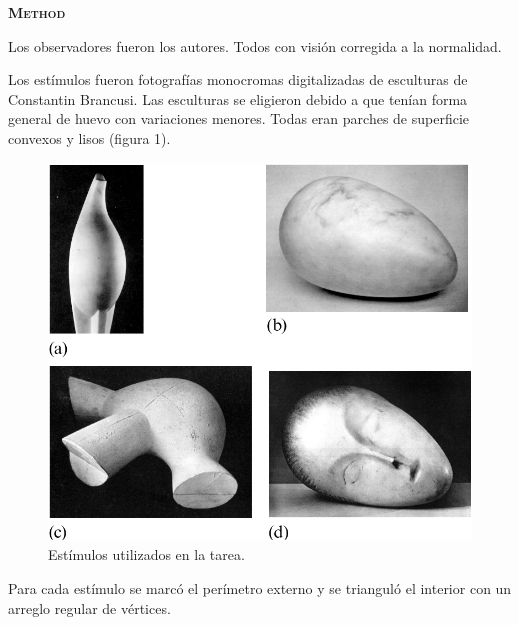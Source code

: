 \documentclass[a4paper,12pt]{article}
\begin{document}
{\scshape\bfseries Method}

Los observadores fueron los autores. Todos con visión corregida a la normalidad.

Los estímulos fueron fotografías monocromas digitalizadas de esculturas de Constantin Brancusi. Las esculturas se eligieron debido a que tenían forma general de huevo con variaciones menores. Todas eran parches de superficie convexos y lisos (figura 1). 

\begin{figure}[ht]
	\begin{center}
		\includegraphics[scale=0.3]{Koenderick2001(1).png}
		\caption{Estímulos utilizados en la tarea.}
	\end{center}
\end{figure}

Para cada estímulo se marcó el perímetro externo y se trianguló el interior con un arreglo regular de vértices.
\end{document}

